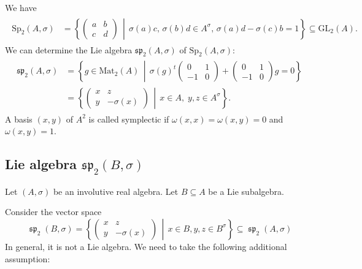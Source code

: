 \documentclass[a4paper,oneside,11pt]{amsart}
\DeclareMathOperator{\spp}{\mathfrak{sp}}
\newcommand{\midwd}{\,\middle\vert\,}
\theoremstyle{plain}
\theoremstyle{definition}
\theoremstyle{remark}
\begin{document}
We have
\begin{align}\label{eq:groups}
    \begin{aligned}
    \mathrm{Sp}_2(A,\sigma)&=\left\{\begin{pmatrix}
    a & b \\
    c & d
    \end{pmatrix}\midwd \sigma(a)c,\,\sigma(b)d\in A^\sigma,\,\sigma(a)d-\sigma(c)b=1\right\}\subseteq \mathrm{GL}_2(A).
    \end{aligned}
\end{align}
We can determine the Lie algebra $\mathfrak{sp}_2(A,\sigma)$ of $\mathrm{Sp}_2(A,\sigma)$:
\begin{align}\label{eq:Lie_algebras}
    \begin{aligned}
	    \mathfrak{sp}_2(A,\sigma)& =\left\{g\in \mathrm{Mat}_2(A)\midwd \sigma(g)^t\begin{pmatrix}
        0 & 1 \\
        -1 & 0
      \end{pmatrix}+ \begin{pmatrix}
        0 & 1 \\
        -1 & 0
      \end{pmatrix} g=0\right\}\\
    & =\left\{\begin{pmatrix}
		x & z \\
		y & -\sigma(x)
	\end{pmatrix}\midwd x\in A,\;y,z\in A^\sigma\right\}.
    \end{aligned}
\end{align}
A basis $(x,y)$ of $A^2$ is called symplectic if $\omega(x,x)=\omega(x,y)=0$ and $\omega(x,y)=1$.
    
\subsection{Lie algebra \texorpdfstring{$\mathfrak{sp}_2(B,\sigma)$}{sp2(B,sigma)}}\label{sec:sp2(B,sigma)}

Let $(A,\sigma)$ be an involutive real algebra. Let $B\subseteq A$ be a Lie subalgebra. 

Consider the vector space
$$\spp_2(B,\sigma)=\left\{\begin{pmatrix}
    x & z \\
    y & -\sigma(x)
    \end{pmatrix}\midwd x\in B, y,z\in B^{\sigma}\right\}\subseteq \spp_2(A,\sigma)$$
In general, it is not a Lie algebra. We need to take the following additional assumption:
\end{document}
